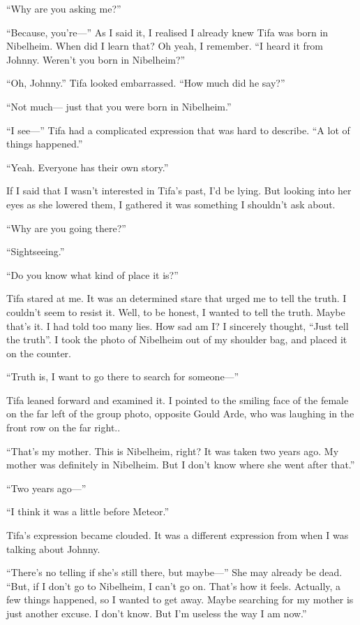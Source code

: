 \documentclass[oneside]{book}
\begin{document}
“Why are you asking me?”

“Because, you’re—” As I said it, I realised I already knew Tifa was born in Nibelheim. When did I learn that? Oh yeah, I remember. “I heard it from Johnny. Weren’t you born in Nibelheim?”

“Oh, Johnny.” Tifa looked embarrassed. “How much did he say?”

“Not much— just that you were born in Nibelheim.”

“I see—” Tifa had a complicated expression that was hard to describe. “A lot of things happened.”

“Yeah. Everyone has their own story.”

If I said that I wasn’t interested in Tifa’s past, I’d be lying. But looking into her eyes as she lowered them, I gathered it was something I shouldn’t ask about.

“Why are you going there?”

“Sightseeing.”

“Do you know what kind of place it is?”

Tifa stared at me. It was an determined stare that urged me to tell the truth. I couldn’t seem to resist it. Well, to be honest, I wanted to tell the truth. Maybe that’s it. I had told too many lies. How sad am I? I sincerely thought, “Just tell the truth”. I took the photo of Nibelheim out of my shoulder bag, and placed it on the counter.

“Truth is, I want to go there to search for someone—”

Tifa leaned forward and examined it. I pointed to the smiling face of the female on the far left of the group photo, opposite Gould Arde, who was laughing in the front row on the far right..

“That’s my mother. This is Nibelheim, right? It was taken two years ago. My mother was definitely in Nibelheim. But I don’t know where she went after that.”

“Two years ago—”

“I think it was a little before Meteor.”

Tifa’s expression became clouded. It was a different expression from when I was talking about Johnny.

“There’s no telling if she’s still there, but maybe—” She may already be dead. “But, if I don’t go to Nibelheim, I can’t go on. That’s how it feels. Actually, a few things happened, so I wanted to get away. Maybe searching for my mother is just another excuse. I don’t know. But I’m useless the way I am now.”
\end{document}
